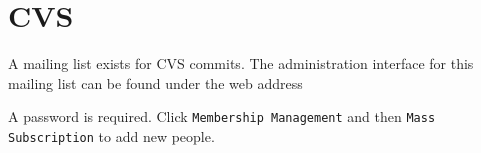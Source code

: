 \section{CVS}


A mailing list exists for CVS commits. The administration interface for this mailing list can be
found under the web address


A password is required. Click {\tt Membership Management} and then {\tt Mass Subscription} to add
new people.

